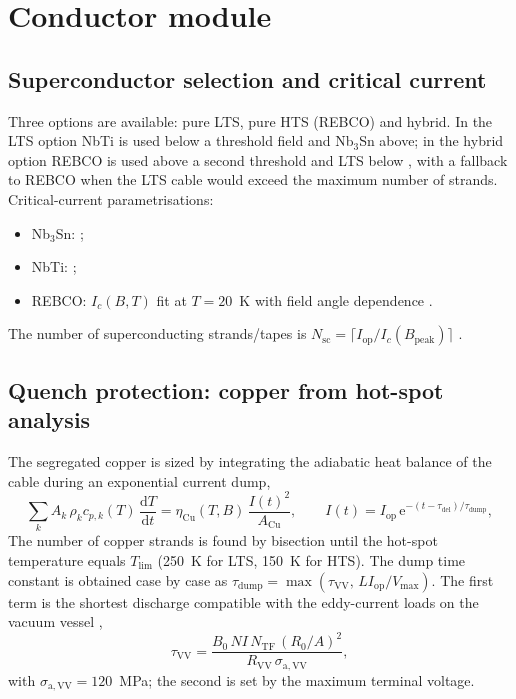 \section{Conductor module}
\label{sec:conductor}

\subsection{Superconductor selection and critical current}
Three options are available: pure LTS, pure HTS (REBCO) and hybrid. In the
LTS option NbTi is used below a threshold field and Nb$_3$Sn above; in the
hybrid option REBCO is used above a second threshold and LTS below
, with a fallback to REBCO when the LTS cable would
exceed the maximum number of strands. Critical-current parametrisations:
\begin{itemize}
\item Nb$_3$Sn: ;
\item NbTi: ;
\item REBCO: $I_c(B,T)$ fit at $T=20$~K with field angle dependence
.
\end{itemize}
The number of superconducting strands/tapes is $N_\mathrm{sc}=\lceil
I_\mathrm{op}/I_c(B_\mathrm{peak})\rceil$ .

\subsection{Quench protection: copper from hot-spot analysis}
The segregated copper is sized by integrating the adiabatic heat balance of
the cable during an exponential current dump,
\begin{equation}
  \sum_k A_k\,\rho_k c_{p,k}(T)\,\frac{\mathrm{d}T}{\mathrm{d}t} =
  \eta_\mathrm{Cu}(T,B)\,\frac{I(t)^2}{A_\mathrm{Cu}},\qquad
  I(t)=I_\mathrm{op}\,\mathrm{e}^{-(t-\tau_\mathrm{del})/\tau_\mathrm{dump}},
\end{equation}
The number of copper strands is found by bisection until the hot-spot
temperature equals $T_\mathrm{lim}$ (250~K for LTS, 150~K for HTS).
The dump time constant is obtained case by case as
$\tau_\mathrm{dump}=\max(\tau_\mathrm{VV},\,L I_\mathrm{op}/V_\mathrm{max})$.
The first term is the shortest discharge compatible with the eddy-current
loads on the vacuum vessel \cite{Giannini2023MADE,Bachmann_aspect},
\begin{equation}
\tau_\mathrm{VV}=\frac{B_0\,NI\,N_\mathrm{TF}\,(R_0/A)^2}{R_\mathrm{VV}\,\sigma_\mathrm{a,VV}},
\end{equation}
with $\sigma_\mathrm{a,VV}=120$~MPa; the second is set by the maximum
terminal voltage.

